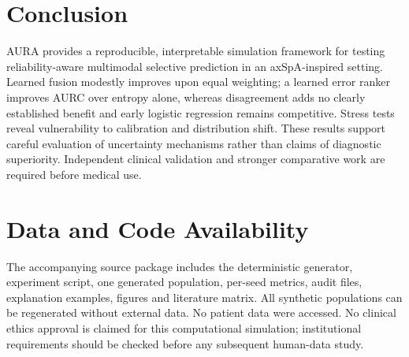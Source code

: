 \documentclass[conference]{IEEEtran}
\begin{document}
\section{Conclusion}
AURA provides a reproducible, interpretable simulation framework for testing reliability-aware multimodal selective prediction in an axSpA-inspired setting. Learned fusion modestly improves upon equal weighting; a learned error ranker improves AURC over entropy alone, whereas disagreement adds no clearly established benefit and early logistic regression remains competitive. Stress tests reveal vulnerability to calibration and distribution shift. These results support careful evaluation of uncertainty mechanisms rather than claims of diagnostic superiority. Independent clinical validation and stronger comparative work are required before medical use.
\section*{Data and Code Availability}
The accompanying source package includes the deterministic generator, experiment script, one generated population, per-seed metrics, audit files, explanation examples, figures and literature matrix. All synthetic populations can be regenerated without external data. No patient data were accessed. No clinical ethics approval is claimed for this computational simulation; institutional requirements should be checked before any subsequent human-data study.
\end{document}
